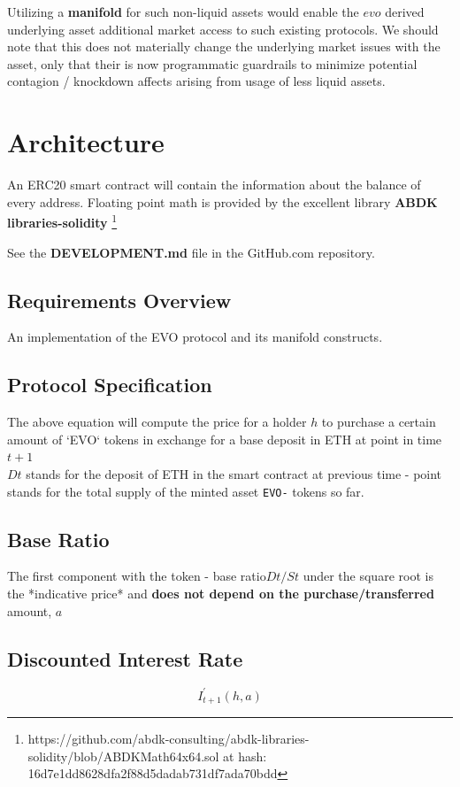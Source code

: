 Utilizing a \textbf{manifold} for such non-liquid assets would enable the $ evo $ derived underlying asset additional market access to such existing protocols. We should note that this does not materially change the underlying market issues with the asset, only that their is now programmatic guardrails to minimize potential contagion / knockdown affects arising from usage of less liquid  assets.




\section{Architecture}


An ERC20 smart contract will contain the information about the balance of every address.
Floating point math is provided by the excellent library \textbf{ABDK libraries-solidity} 
\footnote{https://github.com/abdk-consulting/abdk-libraries-solidity/blob/ABDKMath64x64.sol at hash: 16d7e1dd8628dfa2f88d5dadab731df7ada70bdd }

See the \textbf{DEVELOPMENT.md} file in the GitHub.com repository.

\subsection{Requirements Overview}

An implementation of the EVO protocol and its manifold constructs.

\subsection{Protocol Specification}
The above equation will compute the price for a holder $h$ to purchase a certain amount of `EVO` tokens in exchange for a base deposit in ETH at point in time  $t +1$  \\
$Dt$ stands for the deposit of ETH in the smart contract at previous time - point %
stands for the total supply of the minted asset \texttt{EVO-} tokens so far.

\subsection{Base Ratio}
The first component with the token - base ratio\neweline $ Dt/St $ under the square root is the *indicative price* and \textbf{does not depend on the purchase/transferred} amount, $a$

\subsection{Discounted Interest Rate}
\begin{equation}
    I_{t+1}^{\prime}(h, a)
\end{equation}

